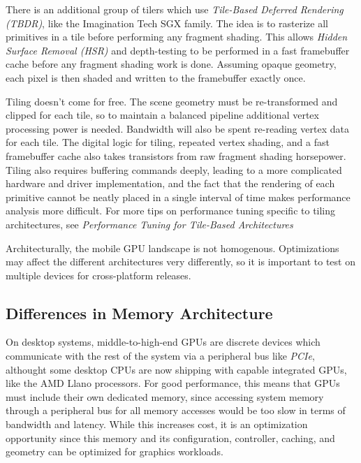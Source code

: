  There is an additional group of tilers
which use \textit{Tile-Based Deferred Rendering (TBDR)}, like the Imagination Tech SGX
family.  The idea is to rasterize all primitives in a tile before performing
any fragment shading.  This allows \textit{Hidden Surface Removal (HSR)} and
depth-testing to be performed in a fast framebuffer cache before any fragment
shading work is done.  Assuming opaque geometry, each pixel is then shaded and
written to the framebuffer exactly once.

Tiling doesn't come for free.  The scene geometry must be re-transformed and
clipped for each
 tile, so to maintain a balanced pipeline additional vertex
processing power is
 needed.  Bandwidth will also be spent re-reading vertex
data for each tile.  The digital
 logic for tiling, repeated vertex shading,
and a fast framebuffer cache also
 takes transistors from raw fragment shading
horsepower.  Tiling also requires buffering commands deeply, leading to a more
complicated hardware and driver implementation, and the fact that the rendering
of each primitive cannot be neatly placed in a single interval of time makes
performance analysis more difficult.  For more tips on
 performance tuning
specific to tiling architectures, see \textit{Performance
 Tuning for
Tile-Based Architectures} \cite{Chapter TODO}
 

Architecturally, the mobile GPU landscape is not homogenous.  Optimizations may
affect the different architectures very differently, so it is important to test
on multiple devices for cross-platform releases.  \subsection{Differences in
Memory
Architecture}\label{Jon-McCaffrey:differences-in-memory-architecture}

On desktop systems, middle-to-high-end GPUs are discrete devices which
communicate with the rest of the system via a peripheral bus like
\textit{PCIe}, althought some desktop CPUs are now shipping with capable
integrated GPUs, like the AMD Llano processors.  For good performance, this
means that GPUs must include their own dedicated memory, since accessing system
memory through a peripheral bus for all memory accesses would be too slow in
terms of bandwidth and latency.  While this increases cost, it is an
optimization opportunity since this memory and its configuration, controller,
caching, and geometry can be optimized for graphics workloads.

